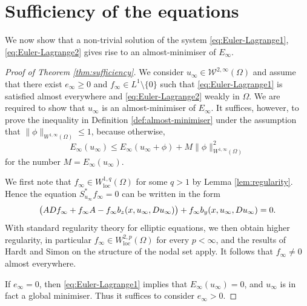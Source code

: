 \documentclass[a4paper]{article}
\newcommand{\W}{\mathcal{W}}
\newcommand{\loc}{\mathrm{loc}}
\let\div\relax\DeclareMathOperator{\div}{div}
\theoremstyle{remark}
\begin{document}
\section{Sufficiency of the equations}

We now show that a non-trivial solution of the system \eqref{eq:Euler-Lagrange1},
\eqref{eq:Euler-Lagrange2} gives rise to an almost-minimiser of $E_\infty$.

\begin{proof}[Proof of Theorem \ref{thm:sufficiency}]
We consider $u_\infty \in \W^{2, \infty}(\Omega)$ and assume that there exist
$e_\infty \ge 0$ and $f_\infty \in L^1 \setminus \{0\}$ such that
\eqref{eq:Euler-Lagrange1} is satisfied almost everywhere and \eqref{eq:Euler-Lagrange2} weakly in $\Omega$. We are required to show that $u_\infty$
is an almost-minimiser of $E_\infty$.
It suffices, however, to prove the inequality in Definition \ref{def:almost-minimiser} under the assumption that
$\|\phi\|_{W^{1, \infty}(\Omega)} \le 1$, because otherwise,
\[
E_\infty(u_\infty) \le E_\infty(u_\infty + \phi) + M \|\phi\|_{W^{1, \infty}(\Omega)}^2
\]
for the number $M = E_\infty(u_\infty)$.

We first note that $f_\infty \in W_\loc^{1, q}(\Omega)$ for some $q > 1$
by Lemma \ref{lem:regularity}. Hence the equation $S_{u_\infty}^* f_\infty = 0$
can be written in the form
\[
\div\bigl(A Df_\infty + f_\infty \div A - f_\infty b_z(x, u_\infty, Du_\infty)\bigr) + f_\infty b_y(x, u_\infty, Du_\infty) = 0.
\]
With standard regularity theory for elliptic
equations, we then obtain higher regularity, in particular
$f_\infty \in W_\loc^{2, p}(\Omega)$ for every $p < \infty$,
and the results of
Hardt and Simon \cite{Hardt-Simon:89} on the structure of the nodal set
apply. It follows that $f_\infty \not= 0$ almost everywhere.

If $e_\infty = 0$, then \eqref{eq:Euler-Lagrange1} implies that $E_\infty(u_\infty) = 0$, and $u_\infty$ is in fact a global minimiser.
Thus it suffices to consider $e_\infty > 0$.


\end{proof}
\end{document}
